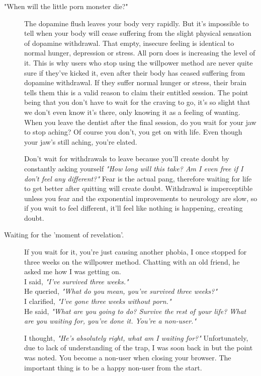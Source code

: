 \documentclass[easypeasy.tex]{subfiles}
\begin{document}
\begin{description}
\begin{description}
      \item["When will the little porn monster die?"]
        The dopamine flush leaves your body very rapidly. But it's impossible to tell when your body will cease suffering from the slight physical sensation of dopamine withdrawal. That empty, insecure feeling is identical to normal hunger, depression or stress. All porn does is increasing the level of it. This is why users who stop using the willpower method are never quite sure if they've kicked it, even after their body has ceased suffering from dopamine withdrawal. If they suffer normal hunger or stress, their brain tells them this is a valid reason to claim their entitled session. The point being that you don't have to wait for the craving to go, it's so slight that we don't even know it's there, only knowing it as a feeling of wanting. When you leave the dentist after the final session, do you wait for your jaw to stop aching? Of course you don't, you get on with life. Even though your jaw's still aching, you're elated.

        Don't wait for withdrawals to leave because you'll create doubt by constantly asking yourself \textit{"How long will this take? Am I even free if I don't feel any different?"} Fear is the actual pang, therefore waiting for life to get better after quitting will create doubt. Withdrawal is imperceptible unless you fear and the exponential improvements to neurology are slow, so if you wait to feel different, it'll feel like nothing is happening, creating doubt.

      \item [Waiting for the 'moment of revelation'.] If you wait for it, you're just causing another phobia, I once stopped for three weeks on the willpower method. Chatting with an old friend, he asked me how I was getting on.\\
        I said, \textit{"I've survived three weeks."}\\
        He queried, \textit{"What do you mean, you've survived three weeks?"}\\
        I clarified, \textit{"I've gone three weeks without porn."}\\
        He said, \textit{"What are you going to do? Survive the rest of your life? What are you waiting for, you've done it. You're a non-user."}

        I thought, \textit{"He's absolutely right, what am I waiting for?"} Unfortunately, due to lack of understanding of the trap, I was soon back in but the point was noted. You become a non-user when closing your browser. The important thing is to be a happy non-user from the start.


\end{description}
\end{description}
\end{document}
